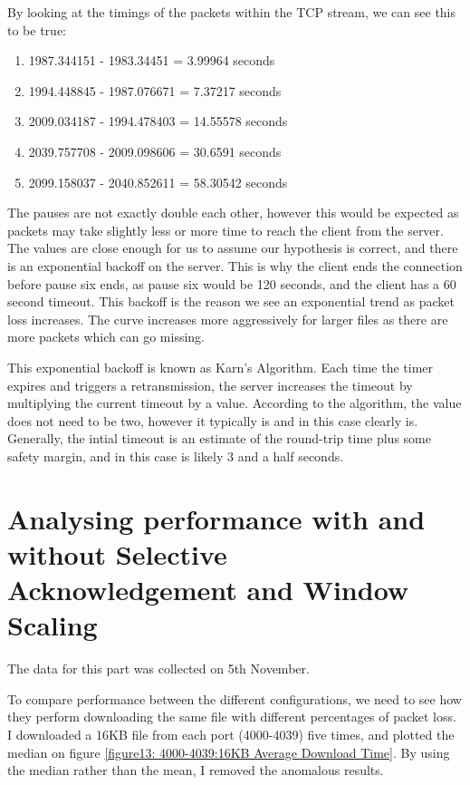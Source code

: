 \documentclass[12pt]{article}
\begin{document}
By looking at the timings of the packets within the TCP stream, we can see this to be true:
\begin{enumerate}
  \item 1987.344151 - 1983.34451 = 3.99964 seconds
  \item 1994.448845 - 1987.076671 = 7.37217 seconds
  \item 2009.034187 - 1994.478403 = 14.55578 seconds
  \item 2039.757708 - 2009.098606 = 30.6591 seconds
  \item 2099.158037 - 2040.852611 = 58.30542 seconds
\end{enumerate}

The pauses are not exactly double each other, however this would be expected as packets may take slightly less or more time to reach the client from the server.
The values are close enough for us to assume our hypothesis is correct, and there is an exponential backoff on the server.
This is why the client ends the connection before pause six ends, as pause six would be 120 seconds, and the client has a 60 second timeout.
This backoff is the reason we see an exponential trend as packet loss increases.
The curve increases more aggressively for larger files as there are more packets which can go missing.

This exponential backoff is known as Karn's Algorithm.
Each time the timer expires and triggers a retransmission, the server increases the timeout by multiplying the current timeout by a value.
According to the algorithm, the value does not need to be two, however it typically is and in this case clearly is.
Generally, the intial timeout is an estimate of the round-trip time plus some safety margin, and in this case is likely 3 and a half seconds.

\section{Analysing performance with and without Selective Acknowledgement and Window Scaling}
The data for this part was collected on 5th November.

To compare performance between the different configurations, we need to see how they perform downloading the same file with different percentages of packet loss.
I downloaded a 16KB file from each port (4000-4039) five times, and plotted the median on figure \ref{figure13: 4000-4039:16KB Average Download Time}.
By using the median rather than the mean, I removed the anomalous results.
\end{document}
